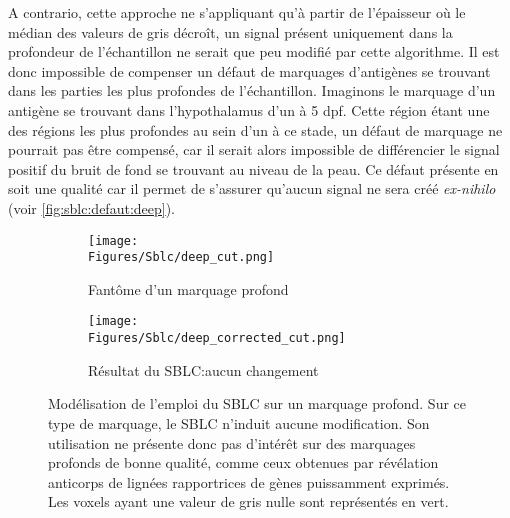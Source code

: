 \documentclass[\main/main.tex]{subfiles}
\begin{document}
%
A contrario, cette approche ne s'appliquant qu'à partir de l'épaisseur où le médian des valeurs de gris décroît, un signal présent uniquement dans la profondeur de l'échantillon ne serait que peu modifié par cette algorithme.
%
Il est donc impossible de compenser un défaut de marquages d'antigènes se trouvant dans les parties les plus profondes de l'échantillon.
%
Imaginons le marquage d'un antigène se trouvant dans l'hypothalamus d'un \pz{} à 5 dpf.
%
Cette région étant une des régions les plus profondes au sein d'un \pz{} à ce stade, un défaut de marquage ne pourrait pas être compensé, car il serait alors impossible de différencier le signal positif du bruit de fond se trouvant au niveau de la peau.
%
Ce défaut présente en soit une qualité car il permet de s'assurer qu'aucun signal ne sera créé \emph{ex-nihilo}  (voir \autoref{fig:sblc:defaut:deep}).

\begin{figure}[h!]
    \centering
    \begin{subfigure}[b]{0.45\textwidth}
        
        \caption{Fantôme d'un marquage profond}
        \centering \texttt{[image: \\Figures/Sblc/deep\_cut.png]}
        \label{fig:sblc:defaut:deep:application}
    \end{subfigure}
    \begin{subfigure}[b]{0.45\textwidth} 
        \caption{Résultat du SBLC:\newline aucun changement}
        \centering \texttt{[image: \\Figures/Sblc/deep\_corrected\_cut.png]}
        \label{fig:sblc:defaut:deep:application}
    \end{subfigure}
    \caption{
        Modélisation de l'emploi du SBLC sur un marquage profond.
        \newline
        Sur ce type de marquage, le SBLC n'induit aucune modification. Son utilisation ne présente donc pas d'intérêt sur des marquages profonds de bonne qualité, comme ceux  obtenues par révélation anticorps de lignées rapportrices de gènes puissamment exprimés.
        \newline
        Les voxels ayant une valeur de gris nulle sont représentés en vert.
        }
    \label{fig:sblc:defaut:deep}
\end{figure}
\end{document}
